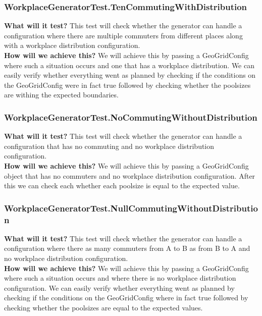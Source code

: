 \documentclass{article}
\begin{document}
\subsubsection{WorkplaceGeneratorTest.TenCommutingWithDistribution}
\textbf{What will it test?}
This test will check whether the generator can handle a configuration where there are multiple commuters from different places along with a workplace distribution configuration.\\
\newline
\textbf{How will we achieve this?}
We will achieve this by passing a GeoGridConfig where such a situation occurs and one that has a workplace distribution. We can easily verify whether everything went as planned by checking if the conditions on the GeoGridConfig were in fact true followed by checking whether the poolsizes are withing the expected boundaries.

\subsubsection{WorkplaceGeneratorTest.NoCommutingWithoutDistribution}
\textbf{What will it test?}
This test will check whether the generator can handle a configuration that has no commuting and no workplace distribution configuration.\\
\newline
\textbf{How will we achieve this?}
We will achieve this by passing a GeoGridConfig object that has no commuters and no workplace distribution configuration. After this we can check each whether each poolsize is equal to the expected value.

\subsubsection{WorkplaceGeneratorTest.NullCommutingWithoutDistribution}
\textbf{What will it test?}
This test will check whether the generator can handle a configuration where there as many commuters from A to B as from B to A and no workplace distribution configuration.\\
\newline
\textbf{How will we achieve this?}
We will achieve this by passing a GeoGridConfig where such a situation occurs and where there is no workplace distribution configuration. We can easily verify whether everything went as planned by checking if the conditions on the GeoGridConfig where in fact true followed by checking whether the poolsizes are equal to the expected values.
\end{document}
